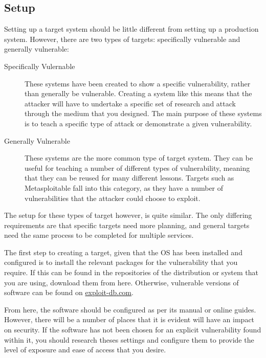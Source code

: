 		\subsection{Setup}
			Setting up a target system should be little different from setting up a production system.
			However, there are two types of targets: specifically vulnerable and generally vulnerable:
			\begin{description}
				\item[Specifically Vulernable]
					These systems have been created to show a specific vulnerability, rather than generally be vulnerable.
					Creating a system like this means that the attacker will have to undertake a specific set of research
					and attack through the medium that you designed.
					The main purpose of these systems is to teach a specific type of attack or demonstrate a given vulnerability.
				\item[Generally Vulnerable]
					These systems are the more common type of target system.
					They can be useful for teaching a number of different types of vulnerability, meaning that they can be reused for many different lessons.
					Targets such as Metasploitable fall into this category, as they have a number of vulnerabilities that the attacker could choose to exploit.
			\end{description}

			The setup for these types of target however, is quite similar.
			The only differing requirements are that specific targets need more planning, and general targets need the same process to be completed for multiple services.

			The first step to creating a target, given that the OS has been installed and configured is to install the relevant packages for the vulnerability that you require.
			If this can be found in the repositories of the distribution or system that you are using, download them from here.
			Otherwise, vulnerable versions of software can be found on \href{https://www.exploit-db.com/remote/?order\_by=application&order=desc&pg=1}{exploit-db.com}.

			From here, the software should be configured as per its manual or online guides.
			However, there will be a number of places that it is evident will have an impact on security.
			If the software has not been chosen for an explicit vulnerability found within it, you should research theses settings and configure them to provide the level of exposure and ease of access that you desire.

